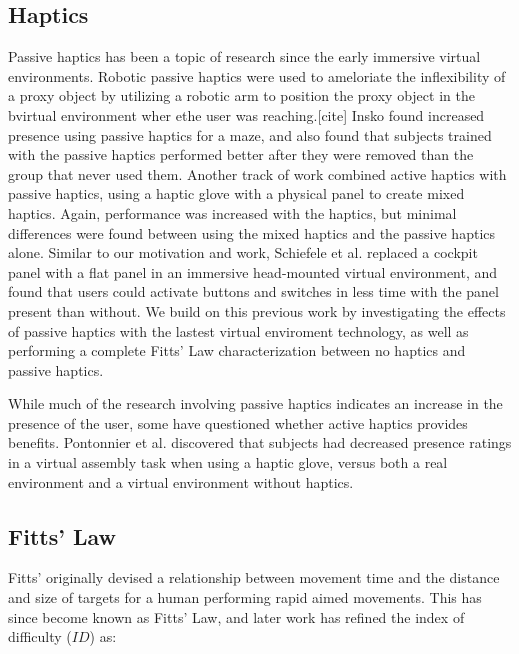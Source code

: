 
\subsection{Haptics}

Passive haptics has been a topic of research since the early immersive virtual environments.
Robotic passive haptics were used to ameloriate the inflexibility of a proxy object by utilizing a robotic arm to position the proxy object in the bvirtual environment wher ethe user was reaching.[cite]
Insko found increased presence using passive haptics for a maze, and also found that subjects trained with the passive haptics performed better after they were removed than the group that never used them.
Another track of work combined active haptics with passive haptics, using a haptic glove with a physical panel to create mixed haptics.
Again, performance was increased with the haptics, but minimal differences were found between using the mixed haptics and the passive haptics alone.
Similar to our motivation and work, Schiefele et al. replaced a cockpit panel with a flat panel in an immersive head-mounted virtual environment, and found that users could activate buttons and switches in less time with the panel present than without.
We build on this previous work by investigating the effects of passive haptics with the lastest virtual enviroment technology, as well as performing a complete Fitts' Law characterization between no haptics and passive haptics.

While much of the research involving passive haptics indicates an increase in the presence of the user, some have questioned whether active haptics provides benefits.
Pontonnier et al. discovered that subjects had decreased presence ratings in a virtual assembly task when using a haptic glove, versus both a real environment and a virtual environment without haptics.

\subsection{Fitts' Law}

Fitts' originally devised a relationship between movement time and the distance and size of targets for a human performing rapid aimed movements.
This has since become known as Fitts' Law, and later work has refined the index of difficulty (${ID}$) as:


